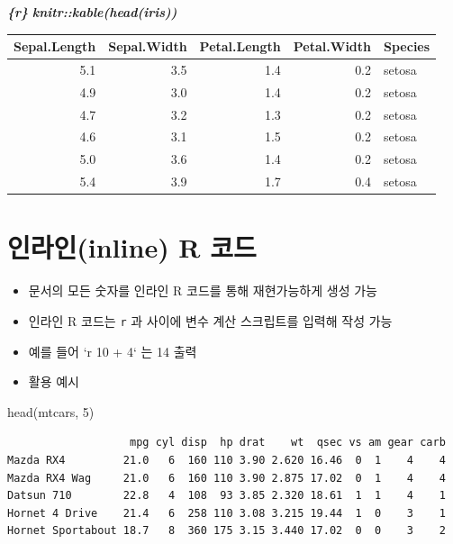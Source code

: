 \documentclass[
  11pt,
]{krantz}
\newenvironment{Shaded}{\begin{snugshade}}{\end{snugshade}}
\newcommand{\DecValTok}[1]{\textcolor[rgb]{0.06,0.06,0.06}{#1}}
\newcommand{\FunctionTok}[1]{\textcolor[rgb]{0,0,0}{#1}}
\newcommand{\InformationTok}[1]{\textcolor[rgb]{0.37,0.37,0.37}{\textbf{\textit{#1}}}}
\newcommand{\NormalTok}[1]{#1}
\providecommand{\tightlist}{%
  \setlength{\itemsep}{0pt}\setlength{\parskip}{0pt}}
\begin{document}
\begin{Shaded}
\begin{Highlighting}[]
\InformationTok{\textasciigrave{}\textasciigrave{}\textasciigrave{}\{r\}}
\InformationTok{knitr::kable(head(iris))}
\InformationTok{\textasciigrave{}\textasciigrave{}\textasciigrave{}}
\end{Highlighting}
\end{Shaded}

\footnotesize

\begin{tabular}{r|r|r|r|l}
\hline
Sepal.Length & Sepal.Width & Petal.Length & Petal.Width & Species\\
\hline
5.1 & 3.5 & 1.4 & 0.2 & setosa\\
\hline
4.9 & 3.0 & 1.4 & 0.2 & setosa\\
\hline
4.7 & 3.2 & 1.3 & 0.2 & setosa\\
\hline
4.6 & 3.1 & 1.5 & 0.2 & setosa\\
\hline
5.0 & 3.6 & 1.4 & 0.2 & setosa\\
\hline
5.4 & 3.9 & 1.7 & 0.4 & setosa\\
\hline
\end{tabular}

\normalsize

\hypertarget{inline-code}{%
\section{인라인(inline) R 코드}\label{inline-code}}

\begin{itemize}
\tightlist
\item
  문서의 모든 숫자를 인라인 R 코드를 통해 재현가능하게 생성 가능
\item
  인라인 R 코드는 \texttt{\textasciigrave{}r} 과 \texttt{\textasciigrave{}} 사이에 변수 계산 스크립트를 입력해 작성 가능
\item
  예를 들어 {`}r 10 + 4` 는 14 출력
\item
  활용 예시
\end{itemize}

\footnotesize

\begin{Shaded}
\begin{Highlighting}[]
\FunctionTok{head}\NormalTok{(mtcars, }\DecValTok{5}\NormalTok{)}
\end{Highlighting}
\end{Shaded}

\begin{verbatim}
                   mpg cyl disp  hp drat    wt  qsec vs am gear carb
Mazda RX4         21.0   6  160 110 3.90 2.620 16.46  0  1    4    4
Mazda RX4 Wag     21.0   6  160 110 3.90 2.875 17.02  0  1    4    4
Datsun 710        22.8   4  108  93 3.85 2.320 18.61  1  1    4    1
Hornet 4 Drive    21.4   6  258 110 3.08 3.215 19.44  1  0    3    1
Hornet Sportabout 18.7   8  360 175 3.15 3.440 17.02  0  0    3    2
\end{verbatim}
\end{document}
